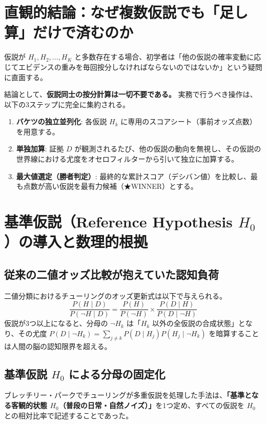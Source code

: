 \section{直観的結論：なぜ複数仮説でも「足し算」だけで済むのか}

仮説が $H_1, H_2, \dots, H_K$ と多数存在する場合、初学者は「他の仮説の確率変動に応じてエビデンスの重みを毎回按分しなければならないのではないか」という疑問に直面する。

結論として、\textbf{仮説同士の按分計算は一切不要である。}
実務で行うべき操作は、以下の3ステップに完全に集約される。

\begin{enumerate}
    \item \textbf{バケツの独立並列化}: 各仮説 $H_k$ に専用のスコアシート（事前オッズ点数）を用意する。
    \item \textbf{単独加算}: 証拠 $D$ が観測されるたび、他の仮説の動向を無視し、その仮説の世界線における尤度をオセロフィルターから引いて独立に加算する。
    \item \textbf{最大値選定（勝者判定）}: 最終的な累計スコア（デシバン値）を比較し、最も点数が高い仮説を最有力候補（★WINNER）とする。
\end{enumerate}

\section{基準仮説（Reference Hypothesis $H_0$）の導入と数理的根拠}

\subsection{従来の二値オッズ比較が抱えていた認知負荷}
二値分類におけるチューリングのオッズ更新式は以下で与えられる。
\begin{equation}
\frac{P(H \mid D)}{P(\neg H \mid D)} = \frac{P(H)}{P(\neg H)} \times \frac{P(D \mid H)}{P(D \mid \neg H)}
\end{equation}
仮説が3つ以上になると、分母の $\neg H_k$ は「$H_k$ 以外の全仮説の合成状態」となり、その尤度 $P(D \mid \neg H_k) = \sum_{j \neq k} P(D \mid H_j) P(H_j \mid \neg H_k)$ を暗算することは人間の脳の認知限界を超える。

\subsection{基準仮説 $H_0$ による分母の固定化}
ブレッチリー・パークでチューリングが多重仮説を処理した手法は、\textbf{「基準となる客観的状態 $H_0$（普段の日常・自然ノイズ）」}を1つ定め、すべての仮説を $H_0$ との相対比率で記述することであった。

